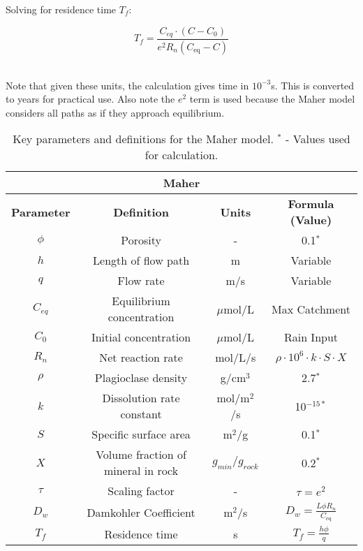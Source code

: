 \begin{tcolorbox}
{\begin{multicols}{2}
\end{multicols}

\begin{multicols}{2}

Solving for residence time \( T_f \):

\columnbreak
\begin{equation}
    T_f = \frac{C_{eq} \cdot \left(C - C_0\right)}{e^2 R_n \left( C_{\text{eq}} - C \right)}
\end{equation}
\

\end{multicols}

Note that given these units, the calculation gives time in \( 10^{-3} \)s. This is converted to years for practical use. Also note the $e^2$ term is used because the Maher model considers all paths as if they approach equilibrium.

\begin{table}[H]
    \centering
    \begin{tabular}{|c|c|c|c|}
        \hline  %
        \multicolumn{4}{|c|}{\textbf{Maher}} \\  
        \hline
        \textbf{Parameter} & \textbf{Definition} & \textbf{Units} & \textbf{Formula (Value)} \\ 
        \hline 
        $\phi$ & Porosity & - & 0.1$^*$ \\
        $h$ & Length of flow path & m & Variable \\
        $q$ & Flow rate & m/s & Variable \\
        $C_{eq}$ & Equilibrium concentration & $\mu$mol/L & Max Catchment \\
        $C_0$ & Initial concentration & $\mu$mol/L & Rain Input \\
        $R_n$ & Net reaction rate & mol/L/s & $\rho \cdot 10^6 \cdot k \cdot S \cdot X $ \\
        $\rho$ & Plagioclase density & g/cm$^3$ & 2.7$^*$ \\
        $k$ & Dissolution rate constant & mol/m$^2$/s & 10$^{-15*}$ \\
        $S$ & Specific surface area & m$^2$/g & 0.1$^*$ \\
        $X$ & Volume fraction of mineral in rock & $g_{min}/g_{rock}$& 0.2$^*$ \\
        $\tau$ & Scaling factor & - & $\tau = e^2$ \\
        $D_w$ & Damkohler Coefficient & m$^2$/s & $D_w = \frac{L \phi R_n}{C_{\text{eq}}}$ \\
        $T_f$ & Residence time & s & $T_f = \frac{h \phi}{q}$ \\
        \hline
    \end{tabular}
    \caption{Key parameters and definitions for the Maher model.  $^*$ - Values used for calculation.}
    \label{tab:parameters4}
\end{table}

\FloatBarrier}




\end{tcolorbox}


